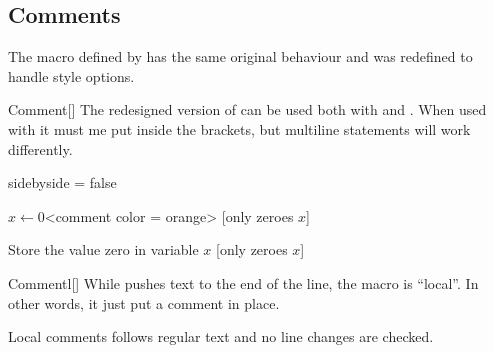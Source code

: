 \documentclass[a4paper, 11pt]{article}
\begin{document}
\subsection{Comments}
The macro  defined by  has the same original behaviour and was redefined to handle style options.

\begin{macro}{Comment}[]
    The redesigned version of  can be used both with  and . When used with  it must me put inside the brackets, but multiline statements will work differently.
\end{macro}

\bigskip
\begin{tcblisting}{sidebyside = false}
    \begin{minipage}{6.5cm} %
        \begin{algorithmic}
            \State $x \gets 0$<comment color = orange>
            [only zeroes $x$] %
        \end{algorithmic}

        \bigskip
        \begin{algorithmic}
            \State Store the value zero in variable $x$
            [only zeroes $x$]
        \end{algorithmic}
    \end{minipage}
\end{tcblisting}

\begin{macro}{Commentl}[]
    While  pushes text to the end of the line, the macro  is ``local''. In other words, it just put a comment in place.

    Local comments follows regular text and no line changes are checked.
\end{macro}

\begin{tcblisting}{}
    \begin{algorithmic}
        \EndIf
    \end{algorithmic}
\end{tcblisting}
\end{document}
